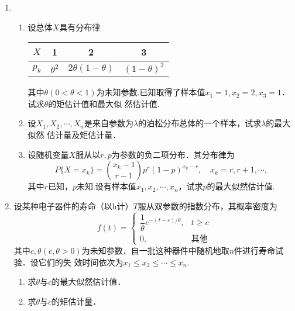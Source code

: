 \documentclass[10pt,a4paper]{article}
\begin{document}
\begin{enumerate}
    \item \begin{enumerate}
        \item 设总体$X$具有分布律
        \renewcommand{\arraystretch}{1.3}
        \begin{table}[H]\centering
            \begin{tabular}{c|ccc}
            $X$   & 1            & 2          & 3                                 \\ \hline
            $p_k$ & $\theta^2$ & $2\theta(1-\theta)$ & $(1-\theta)^2$ 
            \end{tabular}
        \end{table}
        \renewcommand{\arraystretch}{1.0}
        其中$\theta(0<\theta<1)$为未知参数.已知取得了样本值$x_1=1,x_2=2,x_3=1$．试求$\theta$的矩估计值和最大似
        然估计值.
        \item 设$X_1,X_2,\cdots,X_n$是来自参数为$\lambda$的泊松分布总体的一个样本，试求$\lambda$的最大似然
        估计量及矩估计量．
        \item 设随机变量$X$服从以$r,p$为参数的负二项分布．其分布律为
        $$P\{X=x_k\}=\binom{x_k-1}{r-1}p^r(1-p)^{x_k-r},\quad x_k=r,r+1,\cdots,$$
        其中$r$已知，$p$未知.设有样本值$x_1,x_2,\cdots,x_n$，试求$p$的最大似然估计值. 
    \end{enumerate}




    \item 设某种电子器件的寿命（以h计）$T$服从双参数的指数分布，其概率密度为
    $$f(t)=\left\{\begin{array}{ll}
        \dfrac{1}{\theta} e^{-(t-c)/\theta}, & t\geq c\\
        0, & \mbox{其他}
    \end{array}\right.$$
    其中$c,\theta(c,\theta>0)$为未知参数．自一批这种器件中随机地取$n$件进行寿命试验．设它们的失
    效时间依次为$x_1\leq x_2\leq \cdots \leq x_n$.
    \begin{enumerate}
        \item 求$\theta$与$c$的最大似然估计值．
        \item 求$\theta$与$c$的矩估计量．
    \end{enumerate}





\end{enumerate}
\end{document}
